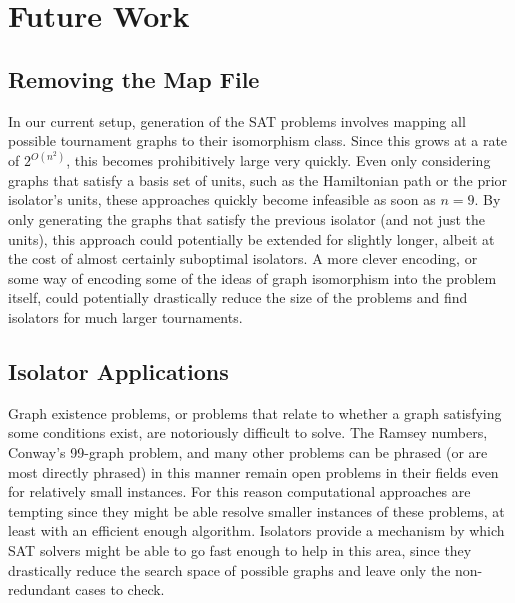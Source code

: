 \documentclass[a4paper,UKenglish,cleveref, autoref, thm-restate]{lipics-v2021}
\begin{document}

\section{Future Work}


\subsection{Removing the Map File}

In our current setup, generation of the SAT problems involves mapping all possible tournament graphs to their isomorphism class.  Since this grows at a rate of $2^{O(n^2)}$, this becomes prohibitively large very quickly.  Even only considering graphs that satisfy a basis set of units, such as the Hamiltonian path or the prior isolator's units, these approaches quickly become infeasible as soon as $n = 9$.  By only generating the graphs that satisfy the previous isolator (and not just the units), this approach could potentially be extended for slightly longer, albeit at the cost of almost certainly suboptimal isolators.  A more clever encoding, or some way of encoding some of the ideas of graph isomorphism into the problem itself, could potentially drastically reduce the size of the problems and find isolators for much larger tournaments.

\subsection{Isolator Applications}

Graph existence problems, or problems that relate to whether a graph satisfying some conditions exist, are notoriously difficult to solve.  The Ramsey numbers, Conway's 99-graph problem, and many other problems can be phrased (or are most directly phrased) in this manner remain open problems in their fields even for relatively small instances.  For this reason computational approaches are tempting since they might be able resolve smaller instances of these problems, at least with an efficient enough algorithm.  Isolators provide a mechanism by which SAT solvers might be able to go fast enough to help in this area, since they drastically reduce the search space of possible graphs and leave only the non-redundant cases to check.
\end{document}
